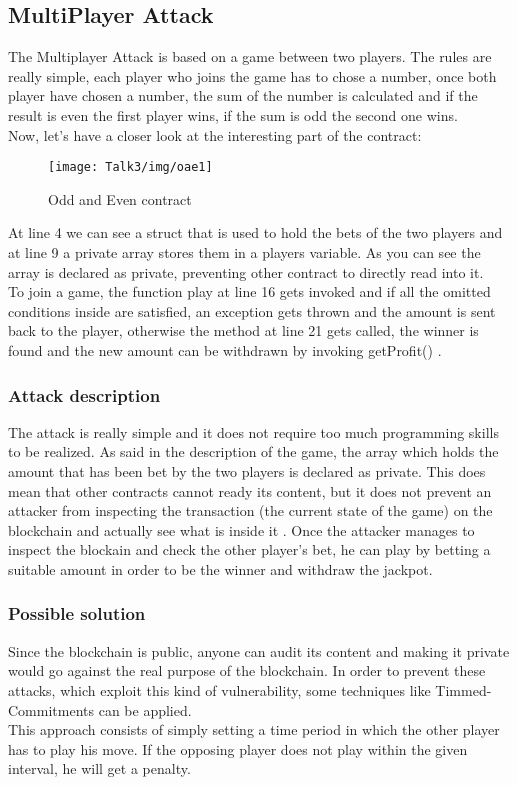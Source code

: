 \subsection{MultiPlayer Attack}
The Multiplayer Attack is based on a game between two players. The rules are really simple, each player who joins the game has to chose a number, once both player have chosen a number, the sum of the number is calculated and if the result is even the first player wins, if the sum is odd the second one wins.
\\Now, let's have a closer look at the interesting part of the contract:
\begin{figure}[H]
\begin{center}
\texttt{[image: Talk3/img/oae1]}
\end{center}
\caption{Odd and Even contract}
\label{label}
\end{figure}
At line 4 we can see a struct that is used to hold the bets of the two players and at line 9 a private array stores them in a players variable. As you can see the array is declared as private, preventing other contract to directly read into it.\\
To join a game,  the function play at line 16 gets invoked and if all the omitted conditions inside are satisfied, an exception gets thrown and the amount is sent back to the player, otherwise the method at line 21 gets called, the winner is found and the new amount can be withdrawn by invoking getProfit() \cite{paper2}.
\subsubsection{Attack description}
The attack is really simple and it does not require too much programming skills to be realized. As said in the description of the game, the array which holds the amount that has been bet by the two players is declared as private. This does mean that other contracts cannot ready its content, but it does not prevent an attacker from inspecting the transaction (the current state of the game) on the blockchain and actually see what is inside it \cite{paper2}. Once the attacker manages to inspect the blockain and check the other player's bet, he can play by betting a suitable amount in order to be the winner and withdraw the jackpot.
\subsubsection{Possible solution}
Since the blockchain is public, anyone can audit its content and making it private would go against the real purpose of the blockchain. In order to prevent these attacks, which exploit this kind of vulnerability, some techniques like Timmed-Commitments \cite{timmedCommitments1, paper2} can be applied.\\
This approach consists of simply setting a time period in which the other player has to play his move. If the opposing player does not play within the given interval, he will get a penalty.
